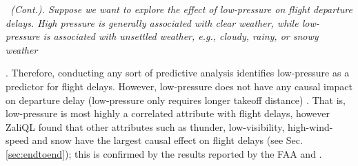    \begin{example} \em \delay \ (Cont.).  \label{ex:press} \em Suppose
     we want to explore the effect of low-pressure on flight departure
     delays. High pressure is generally associated with clear weather,
     while low-pressure is associated with unsettled weather, e.g.,
     cloudy, rainy, or snowy
     weather. Therefore,
     conducting any sort of predictive analysis identifies
     low-pressure as a predictor for flight delays. However,
     low-pressure does not have any causal impact on departure delay
     (low-pressure only requires longer takeoff distance)
     \cite{FAA08}.  That is, low-pressure is most highly a correlated
     attribute with flight delays, however ZaliQL found that other
     attributes such as thunder, low-visibility, high-wind-speed and
     snow have the largest causal effect on flight delays (see
     Sec. \ref{sec:endtoend}); this is confirmed by the results
     reported by the FAA and .

\end{example}







\vspace{-0.1cm}





